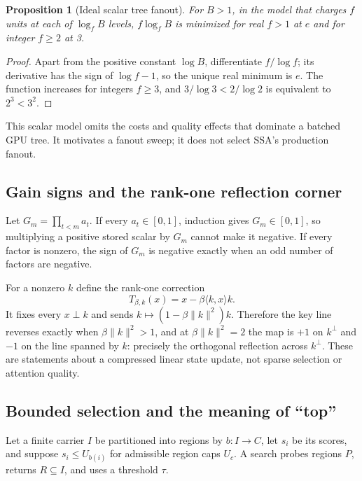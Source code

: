 \documentclass[11pt]{article}
\numberwithin{equation}{section}
\newtheorem{proposition}{Proposition}
\newcommand{\inner}[2]{\langle #1, #2\rangle}
\begin{document}
\begin{proposition}[Ideal scalar tree fanout]\label{prop:app-fanout}
For $B>1$, in the model that charges $f$ units at each of $\log_f B$ levels, $f\log_f B$ is minimized for real $f>1$ at
$e$ and for integer $f\ge2$ at 3.
\end{proposition}
\begin{proof}
Apart from the positive constant $\log B$, differentiate $f/\log f$; its derivative has the sign of
$\log f-1$, so the unique real minimum is $e$. The function increases for integers $f\ge3$, and
$3/\log3<2/\log2$ is equivalent to $2^3<3^2$.
\end{proof}

This scalar model omits the costs and quality effects that dominate a batched GPU tree. It motivates a fanout
sweep; it does not select SSA's production fanout.

\subsection{Gain signs and the rank-one reflection corner}

Let $G_m=\prod_{t<m}a_t$. If every $a_t\in[0,1]$, induction gives $G_m\in[0,1]$, so multiplying a positive
stored scalar by $G_m$ cannot make it negative. If every factor is nonzero, the sign of $G_m$ is negative
exactly when an odd number of factors are negative.

For a nonzero $k$ define the rank-one correction
\begin{equation}\label{eq:app-reflection}
T_{\beta,k}(x)=x-\beta\inner{k}{x}k.
\end{equation}
It fixes every $x\perp k$ and sends $k\mapsto(1-\beta\lVert k\rVert^2)k$. Therefore the key line reverses
exactly when $\beta\lVert k\rVert^2>1$, and at $\beta\lVert k\rVert^2=2$ the map is $+1$ on $k^\perp$ and
$-1$ on the line spanned by $k$: precisely the orthogonal reflection across $k^\perp$. These are statements
about a compressed linear state update, not sparse selection or attention quality.

\subsection{Bounded selection and the meaning of ``top''}

Let a finite carrier $I$ be partitioned into regions by $b:I\to C$, let $s_i$ be its scores, and suppose
$s_i\le U_{b(i)}$ for admissible region caps $U_c$. A search probes regions $P$, returns $R\subseteq I$, and
uses a threshold $\tau$.
\end{document}
